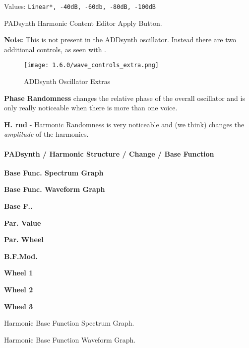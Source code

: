    Values: \texttt{Linear*, -40dB, -60db, -80dB, -100dB}

   PADsynth Harmonic Content Editor Apply Button.

   \textbf{Note:} This is not present in the ADDsynth oscillator. Instead there are two additional
   controls, as seen with
   .

\begin{figure}[H]
   \centering
   \texttt{[image: 1.6.0/wave\_controls\_extra.png]}
   \caption{ADDsynth Oscillator Extras}
   \label{fig:addsynth_wave_controls_extra}
\end{figure}
    \textbf{Phase Randomness} changes the relative phase of the overall oscillator and is only really
    noticeable when there is more than one voice.

    \textbf{H. rnd} - Harmonic Randomness is very noticeable and (we think) changes the
    \textsl{amplitude} of the harmonics.

\paragraph{PADsynth / Harmonic Structure / Change / Base Function}
\label{paragraph:padsynth_harmonic_structure_change_base_function}

   \begin{enumber}
      \item \textbf{Base Func. Spectrum Graph}
      \item \textbf{Base Func. Waveform Graph}
      \item \textbf{Base F..}
      \item \textbf{Par. Value}
      \item \textbf{Par. Wheel}
      \item \textbf{B.F.Mod.}
      \item \textbf{Wheel 1}
      \item \textbf{Wheel 2}
      \item \textbf{Wheel 3}
   \end{enumber}

   \setcounter{ItemCounter}{0}      %

   Harmonic Base Function Spectrum Graph.

   Harmonic Base Function Waveform Graph.

